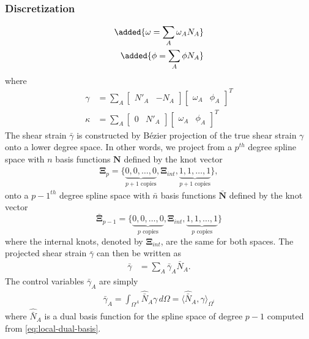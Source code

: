 \documentclass{article}
\begin{document}
\subsubsection{Discretization}
\begin{align}
  \added{\omega = \sum_A \omega_A N_A} \\
  \added{\phi = \sum_A \phi N_A}
\end{align}
where 
{\color{blue}\begin{align}
\gamma &= \sum_A{\begin{bmatrix}N'_A & -N_A\end{bmatrix}\begin{bmatrix}\omega_A & \phi_A\end{bmatrix}^T} \\
\kappa &= \sum_A\begin{bmatrix}0 & N'_A\end{bmatrix}\begin{bmatrix}\omega_A & \phi_A\end{bmatrix}^T
\end{align}}
The shear strain $\bar{\gamma}$ is constructed by B\'{e}zier projection of the true shear strain $\gamma$ onto a lower degree space. In other words, we project from a $p^{th}$ degree spline space with $n$ basis functions $\mathbf{N}$ defined by the knot vector
\begin{align}
\mathbf{\Xi}_{p}=\lbrace{\underbrace{0,0,\ldots,0}_\text{$p+1$ copies}},\mathbf{\Xi}_{int},{\underbrace{1,1,\ldots,1}_\text{$p+1$ copies}}\rbrace,
\label{eq:origin_knot_vector}
\end{align}
onto a $p-1^{th}$ degree spline space with $\bar{n}$ basis functions $\bar{\mathbf{N}}$ defined by the knot vector
\begin{equation}
\bar{\mathbf{\Xi}}_{p-1}=\lbrace{\underbrace{0,0,\ldots,0}_\text{$p$ copies}},\mathbf{\Xi}_{int},{\underbrace{1,1,\ldots,1}_\text{$p$ copies}}\rbrace
\label{eq:projected_knot_vector}
\end{equation}
where the internal knots, denoted by $\mathbf{\Xi}_{int}$, are the same for both spaces. The projected shear strain $\bar{\gamma}$ can then be written as
\begin{align}
  \bar{\gamma} &= \sum_A \bar{\gamma}_A \bar{N}_A.
\end{align}
The control variables $\bar{\gamma}_A$ are simply
\begin{align}
  \bar{\gamma}_A = \int_{\Omega^A} \hat{\bar{N}}_A \gamma \, d\Omega = \langle \hat{\bar{N}}_A, \gamma \rangle_{\Omega^i}
\end{align}
where $\hat{\bar{N}}_A$ is a dual basis function for the spline space of degree $p-1$ computed from \eqref{eq:local-dual-basis}.
\end{document}
